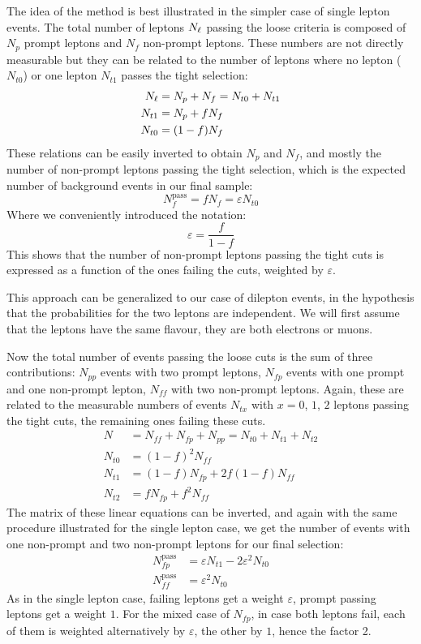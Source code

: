 The idea of the method is best illustrated in the simpler case of single lepton
events.
The total number of leptons $N_{\mathrm{\ell}}$ passing the loose criteria is composed
of $N_p$ prompt leptons and $N_f$ non-prompt leptons. These numbers are not
directly measurable but they can be related to the number of leptons where
no lepton ($N_{t0}$) or one lepton $N_{t1}$ passes the tight selection:
\begin{align*}
    N_{\mathrm{\ell}} &= N_p + N_f = N_{t0} + N_{t1}\\
    N_{t1} &= N_p + fN_f\\
    N_{t0} &= (1 - f) N_f
\end{align*}
These relations can be easily inverted to obtain $N_p$ and $N_f$, and mostly
the number of non-prompt leptons passing the tight selection, which is the
expected number of background events in our final sample:
\begin{equation*}
    N_f^\text{pass} = fN_f = \varepsilon N_{t0}
\end{equation*}
Where we conveniently introduced the notation:
\begin{equation*}
    \varepsilon = \dfrac{f}{1 - f}
\end{equation*}
This shows that the number of non-prompt leptons passing the tight cuts is
expressed as a function of the ones failing the cuts, weighted by
$\varepsilon$.

This approach can be generalized to our case of dilepton events, 
in the hypothesis that the probabilities for the two leptons are independent. We will
first assume that the leptons have the same flavour, \ie they are both
electrons or muons.

Now the total number of events passing the loose cuts is the sum of three
contributions: $N_{pp}$ events with two prompt leptons, $N_{fp}$ events with
one prompt and one non-prompt lepton, $N_{ff}$ with two non-prompt leptons.
Again, these are related to the measurable numbers of events $N_{tx}$ with
 $x = 0$, $1$, $2$ leptons passing the tight cuts, the remaining ones
 failing these cuts.
\begin{align*}
    N &= N_{ff} + N_{fp} + N_{pp} = N_{t0} + N_{t1} + N_{t2}\\
    N_{t0} &= (1 - f)^2 N_{ff}\\
    N_{t1} &= (1 - f) N_{fp} + 2f(1 - f)N_{ff}\\
    N_{t2} &= fN_{fp} + f^2N_{ff}
\end{align*}
The matrix of these linear equations can be inverted, and again with the
same procedure illustrated for the single lepton case, we get the number of
events with one non-prompt and two non-prompt leptons for our final
selection:
\begin{align*}
    N_{fp}^\text{pass} &= \varepsilon N_{t1} - 2 \varepsilon^{2} N_{t0}\\
    N_{ff}^\text{pass} &= \varepsilon^2 N_{t0}
\end{align*}
As in the single lepton case, failing leptons get a weight $\varepsilon$,
prompt passing leptons get a weight $1$.
For the mixed case of $N_{fp}$, in case both leptons fail, each of them is
weighted alternatively by $\varepsilon$, the other by $1$, hence the factor
2. 

